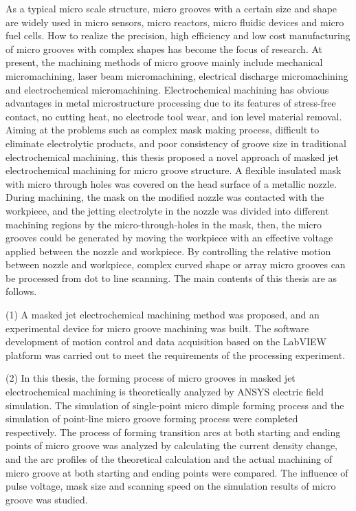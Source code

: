\documentclass[
  type=doctor
]{../gdutthesis}
\begin{document}
\begin{abstract*}
  As a typical micro scale structure, micro grooves with a certain size and shape are
  widely used in micro sensors, micro reactors, micro fluidic devices and micro fuel cells.
  How to realize the precision, high efficiency and low cost manufacturing of micro grooves
  with complex shapes has become the focus of research. At present, the machining methods
  of micro groove mainly include mechanical micromachining, laser beam micromachining,
  electrical discharge micromachining and electrochemical micromachining. Electrochemical
  machining has obvious advantages in metal microstructure processing due to its features of
  stress-free contact, no cutting heat, no electrode tool wear, and ion level material removal.
  Aiming at the problems such as complex mask making process, difficult to eliminate
  electrolytic products, and poor consistency of groove size in traditional electrochemical
  machining, this thesis proposed a novel approach of masked jet electrochemical machining
  for micro groove structure. A flexible insulated mask with micro through holes was covered
  on the head surface of a metallic nozzle. During machining, the mask on the modified nozzle
  was contacted with the workpiece, and the jetting electrolyte in the nozzle was divided into
  different machining regions by the micro-through-holes in the mask, then, the micro grooves
  could be generated by moving the workpiece with an effective voltage applied between the
  nozzle and workpiece. By controlling the relative motion between nozzle and workpiece,
  complex curved shape or array micro grooves can be processed from dot to line scanning.
  The main contents of this thesis are as follows.

  (1) A masked jet electrochemical machining method was proposed, and an experimental
  device for micro groove machining was built. The software development of motion control
  and data acquisition based on the LabVIEW platform was carried out to meet the
  requirements of the processing experiment.

  (2) In this thesis, the forming process of micro grooves in masked jet electrochemical
  machining is theoretically analyzed by ANSYS electric field simulation. The simulation of
  single-point micro dimple forming process and the simulation of point-line micro groove
  forming process were completed respectively. The process of forming transition arcs at both
  starting and ending points of micro groove was analyzed by calculating the current density
  change, and the arc profiles of the theoretical calculation and the actual machining of micro
  groove at both starting and ending points were compared. The influence of pulse voltage,
  mask size and scanning speed on the simulation results of micro groove was studied.


\end{abstract*}
\end{document}
